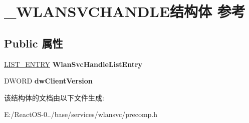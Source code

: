 \hypertarget{struct___w_l_a_n_s_v_c_h_a_n_d_l_e}{}\section{\+\_\+\+W\+L\+A\+N\+S\+V\+C\+H\+A\+N\+D\+L\+E结构体 参考}
\label{struct___w_l_a_n_s_v_c_h_a_n_d_l_e}
\subsection*{Public 属性}
\begin{DoxyCompactItemize}
\item 
\mbox{\label{struct___w_l_a_n_s_v_c_h_a_n_d_l_e_a8425fcde1057b0f06604a8958cb35781}} 
\hyperlink{struct___l_i_s_t___e_n_t_r_y}{L\+I\+S\+T\+\_\+\+E\+N\+T\+RY} {\bfseries Wlan\+Svc\+Handle\+List\+Entry}
\item 
\mbox{\label{struct___w_l_a_n_s_v_c_h_a_n_d_l_e_a81c9fac055245d696ef5cd9a94a298e6}} 
D\+W\+O\+RD {\bfseries dw\+Client\+Version}
\end{DoxyCompactItemize}


该结构体的文档由以下文件生成\+:\begin{DoxyCompactItemize}
\item 
E\+:/\+React\+O\+S-\/0../base/services/wlansvc/precomp.\+h\end{DoxyCompactItemize}
